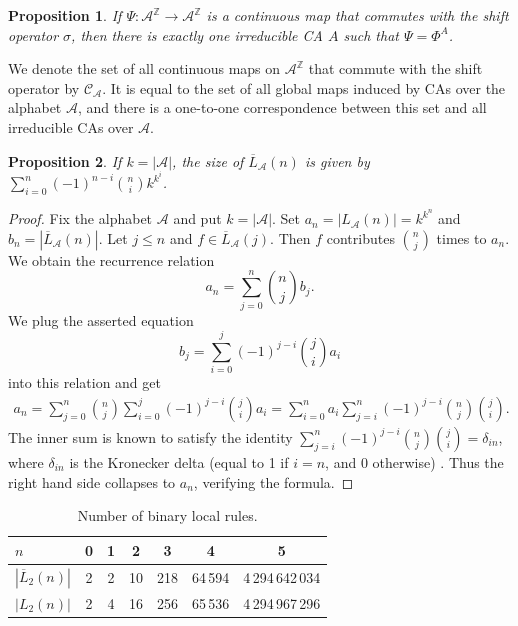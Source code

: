 \documentclass[a4paper]{article}
\newtheorem{prop}{Proposition}
\begin{document}
\begin{prop}
\label{prop:eq-cont}
If  $\Psi: \mathcal{A}^\mathbb{Z} \to \mathcal{A}^\mathbb{Z}$ is a continuous map that commutes with the shift operator $\sigma$,
then there is exactly one irreducible CA $A$ such that $\Psi = \Phi^A$.
\end{prop}
We denote the set of all continuous maps on $\mathcal{A}^\mathbb{Z}$ that commute with the shift operator by
$\mathcal{C}_\mathcal{A}$.
It is equal to the set of all global maps induced by CAs over the alphabet $\mathcal{A}$, and
there is a one-to-one correspondence between this set and all irreducible CAs over $\mathcal{A}$.
\begin{prop}
If $k=|\mathcal{A}|$, the size of $\overline{L}_\mathcal{A}(n)$ is given by $\sum_{i=0}^n (-1)^{n-i} \binom{n}{i} k^{k^i}$.
\end{prop}
\begin{proof}
Fix the alphabet $\mathcal{A}$ and put $k = |\mathcal{A}|$.
Set $a_n = |L_\mathcal{A}(n)| = k^{k^n}$ and $b_n = |\overline{L}_\mathcal{A}(n)|$.
Let $j \leq n$ and $f \in \overline{L}_\mathcal{A}(j)$.
Then $f$ contributes $\binom{n}{j}$ times to $a_n$.
We obtain the recurrence relation
\[
a_n = \sum_{j=0}^n \binom{n}{j} b_j.
\]
We plug the asserted equation
\[
b_j = \sum_{i=0}^j (-1)^{j-i} \binom{j}{i} a_i
\] into this relation and get
\begin{eqnarray*}
a_n = \sum_{j=0}^n \binom{n}{j} \sum_{i=0}^j (-1)^{j-i} \binom{j}{i} a_i
= \sum_{i=0}^n a_i \sum_{j=i}^n (-1)^{j-i} \binom{n}{j} \binom{j}{i}.
\end{eqnarray*}
The inner sum is known to satisfy the identity $\sum_{j=i}^n (-1)^{j-i} \binom{n}{j} \binom{j}{i} = \delta_{in}$, where $\delta_{in}$ is the Kronecker delta (equal to 1 if $i=n$, and 0 otherwise) \cite[p.~169]{Graham94}.
Thus the right hand side collapses to $a_n$, verifying the formula.
\end{proof}

\begin{table}
\begin{center}
\caption{Number of binary local rules.}
\label{tab:irr}
\begin{tabular}{|l|c|c|c|c|c|c|} \hline
$n$       & 0 & 1 & 2  & 3   & 4       & 5 \\ \hline
$|\overline{L}_2(n)|$   & 2 & 2 & 10 & 218 & 64\,594 & 4\,294\,642\,034\\ \hline
$|L_2(n)|$              & 2 & 4 & 16 & 256 & 65\,536 & 4\,294\,967\,296\\ \hline
\end{tabular}
\end{center}
\end{table}
\end{document}
